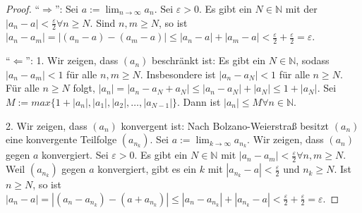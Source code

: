 \documentclass[a4paper,10pt]{article}
\begin{document}
\begin{proof}
 ``$\Rightarrow$'': Sei $a := \lim_{n \rightarrow \infty} a_n$.
 Sei $\varepsilon > 0$.
 Es gibt ein $N \in \mathbb{N}$ mit der $|a_n - a| < \frac{\varepsilon}{2} \forall n \ge N$.
 Sind $n, m \ge N$, so ist $|a_n - a_m| = |(a_n - a) - (a_m - a)| \le |a_n - a| + |a_m - a| < \frac{\varepsilon}{2} + \frac{\varepsilon}{2} = \varepsilon$.
 
 ``$\Leftarrow$'': 1. Wir zeigen, dass $(a_n)$ beschränkt ist:
 Es gibt ein $N \in \mathbb{N}$, sodass $|a_n - a_m| < 1$ für alle $n, m \ge N$.
 Insbesondere ist $|a_n - a_N| < 1$ für alle $n \ge N$.
 Für alle $n \ge N$ folgt, $|a_n| = |a_n - a_N + a_N| \le |a_n - a_N| + |a_N| \le 1 + |a_N|$.
 Sei $M := max \{1 + |a_n|, |a_1|, |a_2|, \dots, |a_{N - 1}|\}$.
 Dann ist $|a_n| \le M \forall n \in \mathbb{N}$.
 
 2. Wir zeigen, dass $(a_n)$ konvergent ist:
 Nach Bolzano-Weierstraß besitzt $(a_n)$ eine konvergente Teilfolge $(a_{n_k})$.
 Sei $a := \lim_{k \rightarrow \infty} a_{n_k}$.
 Wir zeigen, dass $(a_n)$ gegen $a$ konvergiert.
 Sei $\varepsilon > 0$.
 Es gibt ein $N \in \mathbb{N}$ mit $|a_n - a_m| < \frac{\varepsilon}{2} \forall n, m \ge N$.
 Weil $(a_{n_k})$ gegen $a$ konvergiert, gibt es ein $k$ mit $|a_{n_k} - a| < \frac{\varepsilon}{2}$ und $n_k \ge N$.
 Ist $n \ge N$, so ist $|a_n - a| = |(a_n - a_{n_k}) - (a + a_{n_k})| \le |a_n - a_{n_k}| + |a_{n_k} - a| < \frac{\varepsilon}{2} + \frac{\varepsilon}{2} = \varepsilon$.
\end{proof}
\end{document}
